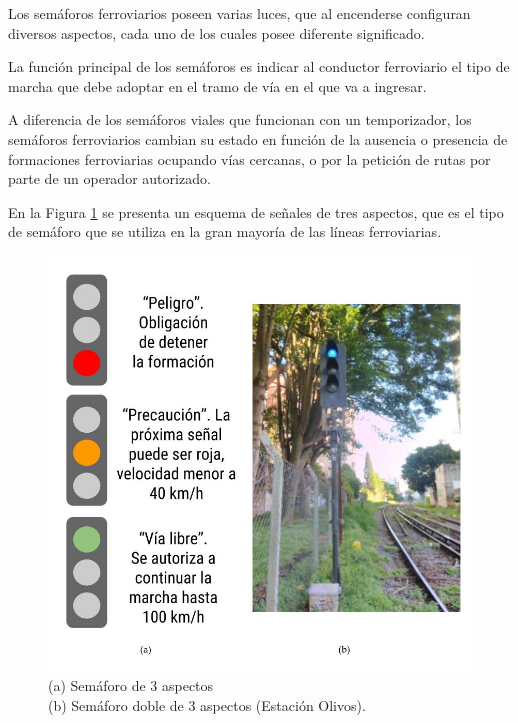 			Los semáforos ferroviarios poseen varias luces, que al encenderse configuran diversos aspectos, cada uno de los cuales posee diferente significado.
			
			La función principal de los semáforos es indicar al conductor ferroviario el tipo de marcha que debe adoptar en el tramo de vía en el que va a ingresar.
			
			A diferencia de los semáforos viales que funcionan con un temporizador, los semáforos ferroviarios cambian su estado en función de la ausencia o presencia de formaciones ferroviarias ocupando vías cercanas, o por la petición de rutas por parte de un operador autorizado.
			
			En la Figura \ref{fig:Sem_3Aspectos} se presenta un esquema de señales de tres aspectos, que es el tipo de semáforo que se utiliza en la gran mayoría de las líneas ferroviarias.
						 	
			 \begin{figure}[htbp!]
				\centering
				\includegraphics[scale=.33]{./Figures/Sem3}
				\caption{(a) Semáforo de 3 aspectos\\(b) Semáforo doble de 3 aspectos (Estación Olivos).}
				\label{fig:Sem_3Aspectos}
			\end{figure}
	
			
